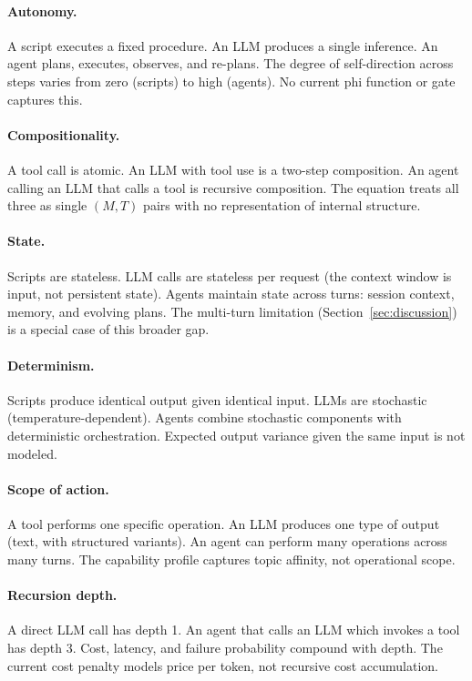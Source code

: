 \paragraph{Autonomy.} A script executes a fixed procedure. An LLM produces a single inference. An agent plans, executes, observes, and re-plans. The degree of self-direction across steps varies from zero (scripts) to high (agents). No current phi function or gate captures this.

\paragraph{Compositionality.} A tool call is atomic. An LLM with tool use is a two-step composition. An agent calling an LLM that calls a tool is recursive composition. The equation treats all three as single $(M, T)$ pairs with no representation of internal structure.

\paragraph{State.} Scripts are stateless. LLM calls are stateless per request (the context window is input, not persistent state). Agents maintain state across turns: session context, memory, and evolving plans. The multi-turn limitation (Section~\ref{sec:discussion}) is a special case of this broader gap.

\paragraph{Determinism.} Scripts produce identical output given identical input. LLMs are stochastic (temperature-dependent). Agents combine stochastic components with deterministic orchestration. Expected output variance given the same input is not modeled.

\paragraph{Scope of action.} A tool performs one specific operation. An LLM produces one type of output (text, with structured variants). An agent can perform many operations across many turns. The capability profile captures topic affinity, not operational scope.

\paragraph{Recursion depth.} A direct LLM call has depth 1. An agent that calls an LLM which invokes a tool has depth 3. Cost, latency, and failure probability compound with depth. The current cost penalty models price per token, not recursive cost accumulation.

